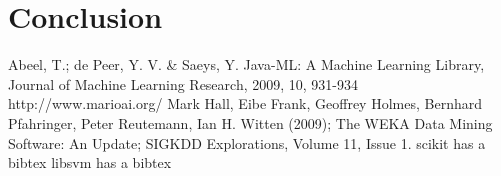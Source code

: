 \documentclass[]{article}   %
\begin{document}
\section{Conclusion}


\begin{thebibliography}{9}
  Abeel, T.; de Peer, Y. V. \& Saeys, Y. Java-ML: A Machine Learning Library, Journal of Machine Learning Research, 2009, 10, 931-934
  http://www.marioai.org/
  Mark Hall, Eibe Frank, Geoffrey Holmes, Bernhard Pfahringer, Peter Reutemann, Ian H. Witten (2009); The WEKA Data Mining Software: An Update; SIGKDD Explorations, Volume 11, Issue 1.
  scikit has a bibtex
  libsvm has a bibtex
\end{thebibliography}
\end{document}
